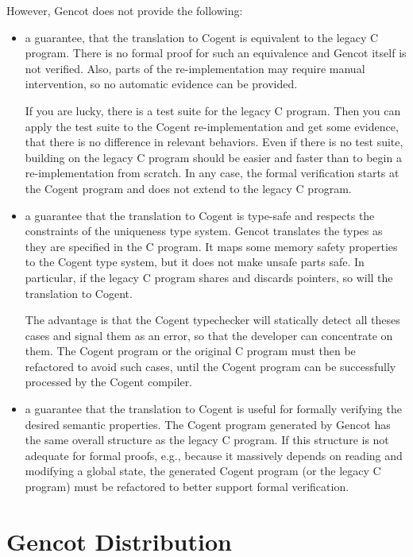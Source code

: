 \documentclass[a4paper]{report}
\begin{document}
However, Gencot does not provide the following:
\begin{itemize}
\item a guarantee, that the translation to Cogent is equivalent to the legacy C program. There is no formal
proof for such an equivalence and Gencot itself is not verified. Also, parts of the re-implementation may
require manual intervention, so no automatic evidence can be provided.

If you are lucky, there is a test suite for the legacy C program. Then you can apply the test suite to the 
Cogent re-implementation and get some evidence, that there is no difference in relevant behaviors. Even if
there is no test suite, building on the legacy C program should be easier and faster than to begin a
re-implementation from scratch. In any case, the formal verification starts at the Cogent program and does not 
extend to the legacy C program.

\item a guarantee that the translation to Cogent is type-safe and respects the constraints of the uniqueness
type system. Gencot translates the types as they are specified in the C program. It maps some memory safety
properties to the Cogent type system, but it does not make unsafe parts safe. In particular, if the legacy
C program shares and discards pointers, so will the translation to Cogent. 

The advantage is that the Cogent typechecker will statically detect all theses cases and signal them as an
error, so that the developer can concentrate on them. The Cogent program or the original C program must then be
refactored to avoid such cases, until the Cogent program  can be successfully processed by the Cogent compiler.

\item a guarantee that the translation to Cogent is useful for formally verifying the desired semantic properties. 
The Cogent program generated by Gencot has the same overall structure as the legacy C program. If this structure
is not adequate for formal proofs, e.g., because it massively depends on reading and modifying a global state,
the generated Cogent program (or the legacy C program) must be refactored to better support formal verification.
\end{itemize}

\section{Gencot Distribution}
\label{intro-dist}
\end{document}
